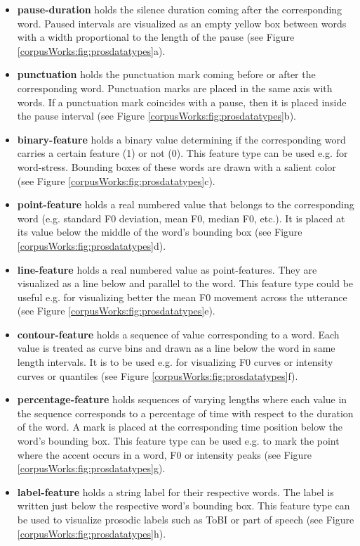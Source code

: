\begin{itemize}
\item \textbf{pause-duration} holds the silence duration coming after the corresponding word. Paused intervals are visualized as an empty yellow box between words with a width proportional to the length of the pause (see Figure \ref{corpusWorks:fig:prosdatatypes}a).
\item \textbf{punctuation} holds the punctuation mark coming before or after the corresponding word. Punctuation marks are placed in the same axis with words. If a punctuation mark coincides with a pause, then it is placed inside the pause interval (see Figure \ref{corpusWorks:fig:prosdatatypes}b).
\item \textbf{binary-feature} holds a binary value determining if the corresponding word carries a certain feature (1) or not (0). This feature type can be used e.g. for word-stress. Bounding boxes of these words are drawn with a salient color (see Figure \ref{corpusWorks:fig:prosdatatypes}c).
\item \textbf{point-feature} holds a real numbered value that belongs to the corresponding word (e.g. standard F0 deviation, mean F0, median F0, etc.). It is placed at its value below the middle of the word's bounding box (see Figure \ref{corpusWorks:fig:prosdatatypes}d).
\item \textbf{line-feature} holds a real numbered value as point-features. They are visualized as a line below and parallel to the word. This feature type could be useful e.g. for visualizing better the mean F0 movement across the utterance (see Figure \ref{corpusWorks:fig:prosdatatypes}e).
\item \textbf{contour-feature} holds a sequence of value corresponding to a word. Each value is treated as curve bins and drawn as a line below the word in same length intervals. It is to be used e.g. for visualizing F0 curves or intensity curves or quantiles (see Figure \ref{corpusWorks:fig:prosdatatypes}f).
\item \textbf{percentage-feature} holds sequences of varying lengths where each value in the sequence corresponds to a percentage of time with respect to the duration of the word. A mark is placed at the corresponding time position below the word's bounding box. This feature type can be used e.g. to mark the point where the accent occurs in a word, F0 or intensity peaks (see Figure \ref{corpusWorks:fig:prosdatatypes}g).
\item \textbf{label-feature} holds a string label for their respective words. The label is written just below the respective word's bounding box. This feature type can be used to visualize prosodic labels such as ToBI or part of speech (see Figure \ref{corpusWorks:fig:prosdatatypes}h). 
\end{itemize}


